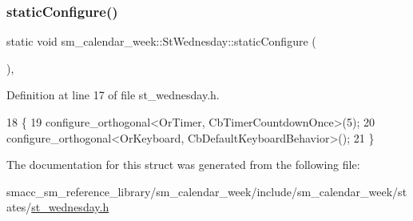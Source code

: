 \subsubsection{\texorpdfstring{static\+Configure()}{staticConfigure()}}
{\footnotesize\ttfamily static void sm\+\_\+calendar\+\_\+week\+::\+St\+Wednesday\+::static\+Configure (\begin{DoxyParamCaption}{ }\end{DoxyParamCaption})\hspace{0.3cm}{\ttfamily [inline]}, {\ttfamily [static]}}



Definition at line 17 of file st\+\_\+wednesday.\+h.


\begin{DoxyCode}
18     \{
19         configure\_orthogonal<OrTimer,  CbTimerCountdownOnce>(5);    
20         configure\_orthogonal<OrKeyboard, CbDefaultKeyboardBehavior>();
21     \}
\end{DoxyCode}


The documentation for this struct was generated from the following file\+:\begin{DoxyCompactItemize}
\item 
smacc\+\_\+sm\+\_\+reference\+\_\+library/sm\+\_\+calendar\+\_\+week/include/sm\+\_\+calendar\+\_\+week/states/\hyperlink{st__wednesday_8h}{st\+\_\+wednesday.\+h}\end{DoxyCompactItemize}
